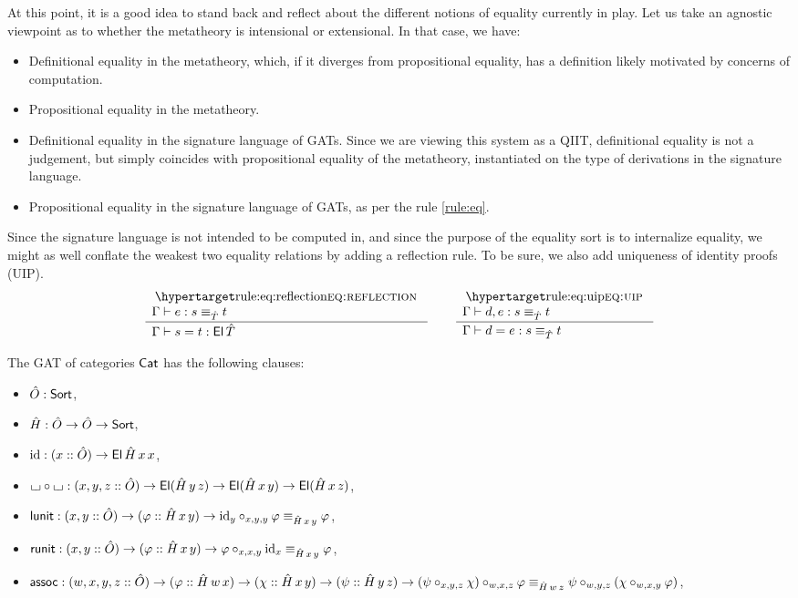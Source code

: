 \documentclass[a4paper]{article}
\begin{document}
At this point, it is a good idea to stand back and reflect about the different notions of equality currently in play.
Let us take an agnostic viewpoint as to whether the metatheory is intensional or extensional.
In that case, we have:
\begin{itemize}
	\item Definitional equality in the metatheory, which, if it diverges from propositional equality, has a definition likely motivated by concerns of computation.
	\item Propositional equality in the metatheory.
	\item Definitional equality in the signature language of GATs. Since we are viewing this system as a QIIT, definitional equality is not a judgement, but simply coincides with propositional equality of the metatheory, instantiated on the type of derivations in the signature language.
	\item Propositional equality in the signature language of GATs, as per the rule \ref{rule:eq}.
\end{itemize}
Since the signature language is not intended to be computed in, and since the purpose of the equality sort is to internalize equality, we might as well conflate the weakest two equality relations by adding a reflection rule.
To be sure, we also add uniqueness of identity proofs (UIP).
\[
	\inferencel{eq:reflection}{
		\Gamma \sez e : \idtp{\hat T} s t
	}{
		\Gamma \sez s = t : \El\,\hat T
	}{}
	\qquad
	\inferencel{eq:uip}{
		\Gamma \sez d, e : \idtp{\hat T} s t
	}{
		\Gamma \sez d = e : \idtp{\hat T} s t
	}{}
\]
\begin{example}
	The GAT of categories $\Cat$ has the following clauses:
	\begin{itemize}[noitemsep]
		\item $\hat O : \Sort$,
		\item $\hat H : \hat O \to \hat O \to \Sort$,
		\item $\id : (x :: \hat O) \to \El\,\hat H\,x\,x$,
		\item $\loch \circ \loch : (x, y, z :: \hat O) \to \El(\hat H\,y\,z) \to \El(\hat H\,x\,y) \to \El(\hat H\,x\,z)$,
		\item $\name{lunit} : (x, y :: \hat O) \to (\vfi :: \hat H\,x\,y) \to \idtp{\hat H\,x\,y}{\id_y \circ_{x,y,y} \vfi}{\vfi}$,
		\item $\name{runit} : (x, y :: \hat O) \to (\vfi :: \hat H\,x\,y) \to \idtp{\hat H\,x\,y}{\vfi \circ_{x,x,y} \id_x}{\vfi}$,
		\item $\name{assoc} : (w, x, y, z :: \hat O) \to (\vfi :: \hat H\,w\,x) \to (\chi :: \hat H\,x\,y) \to (\psi :: \hat H\,y\,z) \to \idtp{\hat H\,w\,z}{(\psi \circ_{x,y,z} \chi) \circ_{w,x,z} \vfi}{\psi \circ_{w,y,z} (\chi \circ_{w,x,y} \vfi)}$,
	\end{itemize}
\end{example}
\end{document}
